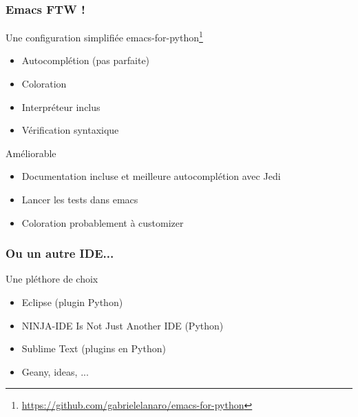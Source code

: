 \documentclass{beamer}
\begin{document}
\begin{frame}
  \frametitle{Emacs FTW !}

  \begin{block}{Une configuration simplifiée}
    emacs-for-python\footnote{\tiny\url{https://github.com/gabrielelanaro/emacs-for-python}}
    \begin{itemize}
    \item Autocomplétion (pas parfaite)
    \item Coloration
    \item Interpréteur inclus
    \item Vérification syntaxique
    \end{itemize}
  \end{block}

  \pause

  \begin{block}{Améliorable}
    \begin{itemize}
    \item Documentation incluse et meilleure autocomplétion avec Jedi
    \item Lancer les tests dans emacs
    \item Coloration probablement à customizer
    \end{itemize}
  \end{block}
\end{frame}

\begin{frame}
  \frametitle{Ou un autre IDE...}

  \begin{block}{Une pléthore de choix}
    \begin{itemize}
    \item Eclipse (plugin Python)
    \item NINJA-IDE Is Not Just Another IDE (Python)
    \item Sublime Text (plugins en Python)
    \item Geany, ideas, ...
    \end{itemize}
  \end{block}
\end{frame}
\end{document}

